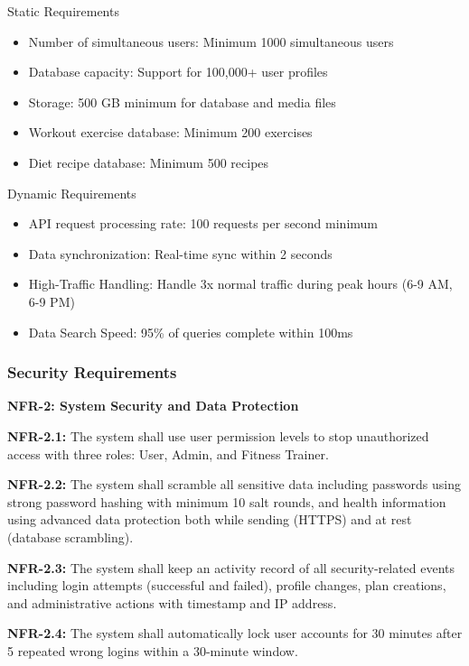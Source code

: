 \documentclass[12pt,a4paper]{article}
\begin{document}
Static Requirements

\begin{itemize}
\item Number of simultaneous users: Minimum 1000 simultaneous users
\item Database capacity: Support for 100,000+ user profiles
\item Storage: 500 GB minimum for database and media files
\item Workout exercise database: Minimum 200 exercises
\item Diet recipe database: Minimum 500 recipes
\end{itemize}

Dynamic Requirements

\begin{itemize}
\item API request processing rate: 100 requests per second minimum
\item Data synchronization: Real-time sync within 2 seconds
\item High-Traffic Handling: Handle 3x normal traffic during peak hours (6-9 AM, 6-9 PM)
\item Data Search Speed: 95\% of queries complete within 100ms
\end{itemize}

\subsubsection{Security Requirements}

\textbf{NFR-2: System Security and Data Protection}

\textbf{NFR-2.1:} The system shall use user permission levels to stop unauthorized access with three roles: User, Admin, and Fitness Trainer.

\textbf{NFR-2.2:} The system shall scramble all sensitive data including passwords using strong password hashing with minimum 10 salt rounds, and health information using advanced data protection both while sending (HTTPS) and at rest (database scrambling).

\textbf{NFR-2.3:} The system shall keep an activity record of all security-related events including login attempts (successful and failed), profile changes, plan creations, and administrative actions with timestamp and IP address.

\textbf{NFR-2.4:} The system shall automatically lock user accounts for 30 minutes after 5 repeated wrong logins within a 30-minute window.
\end{document}
